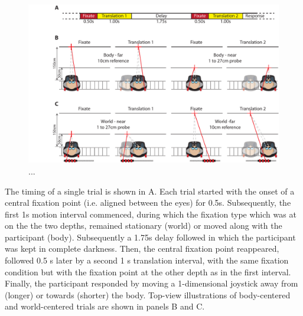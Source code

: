 \begin{figure}
    \includegraphics[width=1.0\textwidth]{src/paper4/p4_figure1.pdf}

    \caption{...}
    \label{p4:fig1}    
\end{figure}
 
The timing of a single trial is shown in A. Each trial started with the onset of a central fixation point (i.e. aligned between the eyes) for 0.5s. Subsequently, the first 1s motion interval commenced, during which the fixation type which was at on the the two depths, remained stationary (world) or moved along with the participant (body). Subsequently a 1.75s delay followed in which the participant was kept in complete darkness. Then, the central fixation point reappeared, followed 0.5 \si{\second} later by a second 1 \si{\second} translation interval, with the same fixation condition but with the fixation point at the other depth as in the first interval. Finally, the participant responded by moving a 1-dimensional joystick away from (longer) or towards (shorter) the body. Top-view illustrations of body-centered and world-centered trials are shown in  panels B and C.

